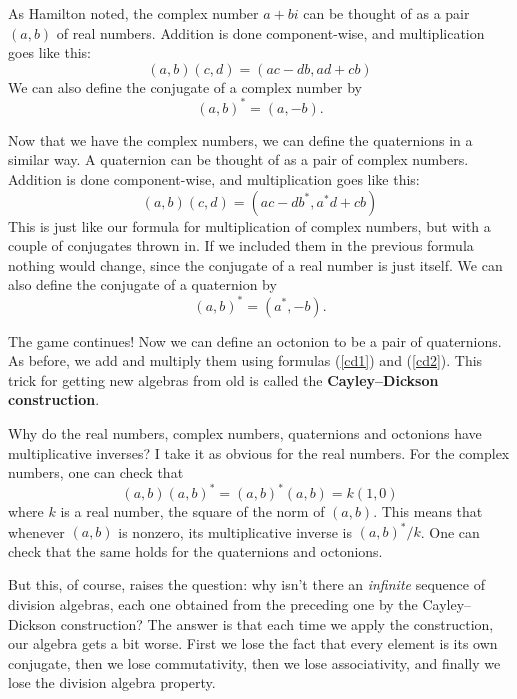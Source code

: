 \documentclass[12pt]{article}
\newcommand{\be}{\begin{equation}}
\newcommand{\ee}{\end{equation}}
\begin{document}
As Hamilton noted, the complex number $a+bi$ can be thought of as a pair
$(a,b)$ of real numbers.  Addition is done component-wise, and
multiplication goes like this:
\[            (a,b)(c,d) = (ac - db,ad + cb)   \]   
We can also define the conjugate of a complex number by   
\[                (a,b)^* = (a,-b).   \]   
   
Now that we have the complex numbers, we can define the   
quaternions in a similar way.  A quaternion can be thought of    
as a pair of complex numbers.  Addition is done component-wise,   
and multiplication goes like this:   
\be          (a,b)(c,d) = (ac - db^*, a^* d + cb)      \label{cd1} \ee   
This is just like our formula for multiplication of complex numbers, but
with a couple of conjugates thrown in.  If we included them in 
the previous formula nothing would change, since the conjugate of a
real number is just itself.  We can also define the conjugate of a
quaternion by
\be          (a,b)^* = (a^*,-b).        \label{cd2} \ee   
   
The game continues!  Now we can define an octonion to be a pair of
quaternions.  As before, we add and multiply them using formulas
(\ref{cd1}) and (\ref{cd2}).  This trick for getting new algebras from
old is called the {\bf Cayley--Dickson construction}.
   
Why do the real numbers, complex numbers, quaternions   
and octonions have multiplicative inverses?  I take it as   
obvious for the real numbers.  For the complex numbers,    
one can check that   
\[    (a,b) (a,b)^* = (a,b)^* (a,b) = k (1,0)  \]   
where $k$ is a real number, the square of the norm of $(a,b)$.     
This means that whenever $(a,b)$ is nonzero, its multiplicative    
inverse is $(a,b)^*/k$.  One can check that the same holds for the    
quaternions and octonions.   
   
But this, of course, raises the question: why isn't there an {\it
infinite} sequence of division algebras, each one obtained from the
preceding one by the Cayley--Dickson construction?  The answer is that
each time we apply the construction, our algebra gets a bit worse.
First we lose the fact that every element is its own conjugate, then we
lose commutativity, then we lose associativity, and finally we lose the
division algebra property.
   
\end{document}
